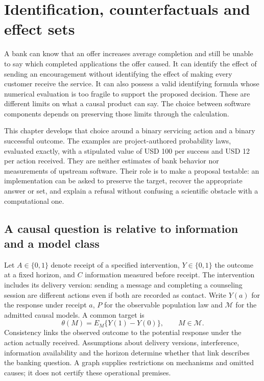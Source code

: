 \chapter{Identification, counterfactuals and effect sets}
\label{exec17:s3}

A bank can know that an offer increases average completion and still be unable
to say which completed applications the offer caused. It can identify the
effect of sending an encouragement without identifying the effect of making
every customer receive the service. It can also possess a valid identifying
formula whose numerical evaluation is too fragile to support the proposed
decision. These are different limits on what a causal product can say. The
choice between software components depends on preserving those limits through
the calculation.

This chapter develops that choice around a binary servicing action and a
binary successful outcome. The examples are project-authored probability
laws, evaluated exactly, with a stipulated value of USD 100 per success and
USD 12 per action received. They are neither estimates of bank behavior nor
measurements of upstream software. Their role is to make a proposal testable:
an implementation can be asked to preserve the target, recover the
appropriate answer or set, and explain a refusal without confusing a
scientific obstacle with a computational one.~\citep{exec17_s3_exact}

\section{A causal question is relative to information and a model class}
\label{exec17:s3-target}

Let $A\in\{0,1\}$ denote receipt of a specified intervention, $Y\in\{0,1\}$
the outcome at a fixed horizon, and $C$ information measured before receipt.
The intervention includes its delivery version: sending a message and
completing a counseling session are different actions even if both are
recorded as contact. Write $Y(a)$ for the response under receipt $a$,
$P$ for the observable population law and $\mathcal M$ for the admitted
causal models. A common target is
\[
 \theta(M)=E_M\{Y(1)-Y(0)\},\qquad M\in\mathcal M.
\]
Consistency links the observed outcome to the potential response under
the action actually received. Assumptions about delivery versions,
interference, information availability and the horizon determine whether
that link describes the banking question. A graph supplies restrictions
on mechanisms and omitted causes; it does not certify these operational
premises.~\citep{pearl2009,swig2013}

